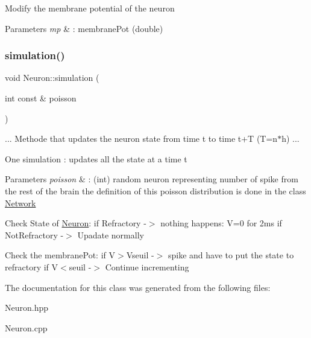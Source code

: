 Modify the membrane potential of the neuron 
\begin{DoxyParams}{Parameters}
{\em mp} & \+: membrane\+Pot (double) \\
\hline
\end{DoxyParams}
\mbox{\label{class_neuron_abce9bb9eecd7ff1f93b5a816bdaacc6f}} 
\subsubsection{\texorpdfstring{simulation()}{simulation()}}
{\footnotesize\ttfamily void Neuron\+::simulation (\begin{DoxyParamCaption}\item[{int const \&}]{poisson }\end{DoxyParamCaption})}

... Methode that updates the neuron state from time t to time t+T (T=n$\ast$h) ...

One simulation \+: updates all the state at a time t 
\begin{DoxyParams}{Parameters}
{\em poisson} & \+: (int) random neuron representing number of spike from the rest of the brain the definition of this poisson distribution is done in the class \hyperlink{class_network}{Network} \\
\hline
\end{DoxyParams}
Check State of \hyperlink{class_neuron}{Neuron}\+: if Refractory -\/$>$ nothing happens\+: V=0 for 2ms if Not\+Refractory -\/$>$ Upadate normally

Check the membrane\+Pot\+: if V$>$Vseuil -\/$>$ spike and have to put the state to refractory if V$<$seuil -\/$>$ Continue incrementing

The documentation for this class was generated from the following files\+:\begin{DoxyCompactItemize}
\item 
Neuron.\+hpp\item 
Neuron.\+cpp\end{DoxyCompactItemize}

